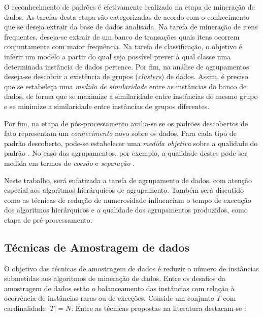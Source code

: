 O reconhecimento de padrões é efetivamente realizado na etapa de mineração de
dados. As tarefas desta etapa são categorizadas de acordo com o conhecimento que
se deseja extrair da base de dados analisada. Na tarefa de mineração de itens
frequentes, deseja-se extrair de um banco de transações quais itens ocorrem
conjuntamente com maior frequência. Na tarefa de classificação, o objetivo é
inferir um modelo a partir do qual seja possível prever à qual classe uma
determinada instância de dados pertence. Por fim, na análise de agrupamentos
deseja-se descobrir a existência de grupos (\emph{clusters}) de dados. Assim, é
preciso que se estabeleça uma \emph{medida de similaridade} entre as instâncias
do banco de dados, de forma que se maximize a similaridade entre instâncias do
mesmo grupo e se minimize a similaridade entre instâncias de grupos diferentes.

Por fim, na etapa de pós-processamento avalia-se se os padrões descobertos de
fato representam um \emph{conhecimento} novo sobre os dados. Para cada tipo
de padrão descoberto, pode-se estabelecer uma \emph{medida objetiva} sobre a
qualidade do padrão \cite{han2011data}. No caso dos agrupamentos, por exemplo,
a qualidade destes pode ser medida em termos de \emph{coesão} e \emph{separação}
\cite{tan2009introducao}.

Neste trabalho, será enfatizada a tarefa de agrupamento de dados, com atenção
especial aos algoritmos hierárquicos de agrupamento. Também será discutido como
as técnicas de redução de numerosidade influenciam o tempo de execução dos
algoritmos hierárquicos e a qualidade dos agrupamentos produzidos, como etapa de
pré-processamento.


\subsection{Técnicas de Amostragem de dados}
	\label{subsec:amostragem}
	
O objetivo das técnicas de amostragem de dados é reduzir o número de instâncias
submetidas aos algoritmos de mineração de dados. Entre os desafios da amostragem
de dados estão o balanceamento das instâncias com relação à ocorrência de
instâncias raras ou de exceções. Conside um conjunto $T$ com cardinalidade
$|T| = N$. Entre as técnicas propostas na literatura destacam-se
\cite{Garcia2015}:

